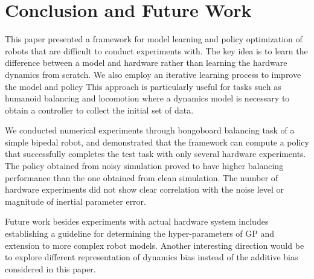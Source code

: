 \documentclass[letterpaper, 10 pt, conference]{ieeeconf}
\begin{document}
\section{Conclusion and Future Work}  \label{sec:learning_conclusion}

This paper presented a framework for model learning and policy
optimization of robots that are difficult to conduct experiments with.
The key idea is to learn the difference between a model and hardware
rather than learning the hardware dynamics from scratch.
We also employ an iterative learning process to improve the model and
policy 
This approach is particularly useful for tasks such as humanoid
balancing and locomotion where a dynamics model is necessary to obtain a
controller to collect the initial set of data.

We conducted numerical experiments through bongoboard balancing task of
a simple bipedal robot, and demonstrated that the framework can compute
a policy that successfully completes the test task with only several
hardware experiments.
The policy obtained from noisy simulation proved to have higher
balancing performance than the one obtained from clean simulation.
The number of hardware experiments did not show clear correlation with the
noise level or magnitude of inertial parameter error.

Future work besides experiments with actual hardware system includes
establishing a guideline for determining the hyper-parameters of GP and
extension to more complex robot models.
Another interesting direction would be to explore different
representation of dynamics bias instead of the additive bias considered
in this paper. 


%


\end{document}
